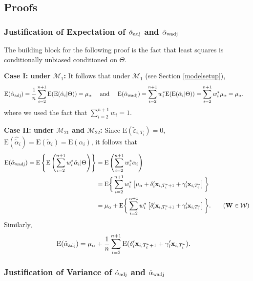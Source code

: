 \documentclass[11pt]{article}
\def\mbf#1{\mathbf{#1}} %
\def\mrm#1{\mathrm{#1}} %
\def\mc#1{\mathcal{#1}} %
\def\E#1{\mathrm{E}(#1)} %
\theoremstyle{definition}
\begin{document}
\subsection{Proofs}

\label{proofs}

\subsubsection{Justification of Expectation of $\hat{\alpha}_{\rm adj}$ and $\hat{\alpha}_{\rm wadj}$}
\label{exp}

The building block for the following proof is the fact that least squares is conditionally unbiased conditioned on $\Theta$. 

\noindent \textbf{Case I: under $\mc{M}_{1}$:} It follows that  under $\mc{M}_{1}$ (see Section \ref{modelsetup}),
\begin{align*}
\E{\hat{\alpha}_{\rm adj}} =\frac{1}{n}  \sum_{i=2}^{n+1} \E{\E{\hat{\alpha}_i|\Theta}} = \mu_{\alpha} 
\quad \text{ and } \quad \E{\hat{\alpha}_{\rm wadj}}&= \sum_{i=2}^{n+1} w_i^* \E{\E{\hat{\alpha}_i|\Theta}}= \sum_{i=2}^{n+1} w_i^*\mu_{\alpha}= \mu_{\alpha}.
\end{align*}
where we used the fact that $\sum_{i=2}^{n+1} w_i=1$. 

\noindent \textbf{Case II: under $\mc{M}_{21}$ and $\mc{M}_{22}$:} Since $\E{\tilde{\varepsilon}_{i, T_i}}=0$, $\E{\hat{\tilde{\alpha}}_{i}}=\E{\tilde{\alpha}_{i}}=\E{\alpha_{i}}$, it follows that
  \begin{align*}
   \E{\hat{\alpha}_{\rm wadj}}= \mrm{E}\left\{\mrm{E}\left(\sum_{i=2}^{n+1} w_i^*\hat{\alpha}_i|\Theta\right)\right\}
   &= \mrm{E}\left( \sum_{i=2}^{n+1} w_i^*\alpha_i\right)\\
   &= \mrm{E}\bigg\{ \sum_{i=2}^{n+1} w_i^*\left[\mu_{\alpha}+\delta_{i}'\mbf{x}_{i, T_i^*+1}+\gamma_i'\mbf{x}_{i, T^*_i}\right]\bigg\}\\
   &=\mu_{\alpha}+\mrm{E}\bigg\{ \sum_{i=2}^{n+1} w_i^*\left[\delta_{i}'\mbf{x}_{i, T_i^*+1}+\gamma_i'\mbf{x}_{i, T^*_i}\right]\bigg\}.\tag{$\mbf{W}\in \mc{W}$}
   \end{align*}
Similarly,
  \begin{align*}
   \E{\hat{\alpha}_{\rm adj}}
   &=\mu_{\alpha}+\frac{1}{n}\sum_{i=2}^{n+1} \E{\delta_{i}'\mbf{x}_{i, T_i^*+1}+\gamma_i'\mbf{x}_{i, T^*_i}}.
   \end{align*}


\subsubsection{Justification of Variance of $\hat{\alpha}_{\rm adj}$ and $\hat{\alpha}_{\rm wadj}$}
\label{var}
\end{document}
